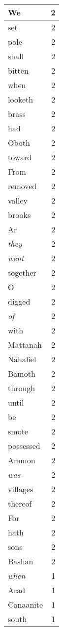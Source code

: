 \begin{center}
\begin{longtable}{l|r}
We & 2 \\ \hline
set & 2 \\ \hline
pole & 2 \\ \hline
shall & 2 \\ \hline
bitten & 2 \\ \hline
when & 2 \\ \hline
looketh & 2 \\ \hline
brass & 2 \\ \hline
had & 2 \\ \hline
Oboth & 2 \\ \hline
toward & 2 \\ \hline
From & 2 \\ \hline
removed & 2 \\ \hline
valley & 2 \\ \hline
brooks & 2 \\ \hline
Ar & 2 \\ \hline
\emph{they} & 2 \\ \hline
\emph{went} & 2 \\ \hline
together & 2 \\ \hline
O & 2 \\ \hline
digged & 2 \\ \hline
\emph{of} & 2 \\ \hline
with & 2 \\ \hline
Mattanah & 2 \\ \hline
Nahaliel & 2 \\ \hline
Bamoth & 2 \\ \hline
through & 2 \\ \hline
until & 2 \\ \hline
be & 2 \\ \hline
smote & 2 \\ \hline
possessed & 2 \\ \hline
Ammon & 2 \\ \hline
\emph{was} & 2 \\ \hline
villages & 2 \\ \hline
thereof & 2 \\ \hline
For & 2 \\ \hline
hath & 2 \\ \hline
sons & 2 \\ \hline
Bashan & 2 \\ \hline
\emph{when} & 1 \\ \hline
Arad & 1 \\ \hline
Canaanite & 1 \\ \hline
south & 1 \\ \hline

\end{longtable}
\end{center}
